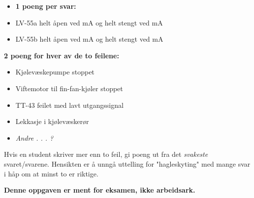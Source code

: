 \begin{itemize}
\item{} {\bf 1 poeng per svar:}
\item{} LV-55a helt åpen ved  mA og helt stengt ved  mA
\item{} LV-55b helt åpen ved  mA og helt stengt ved  mA
\end{itemize}

\vskip 10pt

{\bf 2 poeng for hver av de to feilene:}

\begin{itemize}
\item{} Kjølevæskepumpe stoppet
\item{} Viftemotor til fin-fan-kjøler stoppet
\item{} TT-43 feilet med lavt utgangssignal
\item{} Lekkasje i kjølevæskerør
\item{} {\it Andre . . . ?}
\end{itemize}

Hvis en student skriver mer enn to feil, gi poeng ut fra det {\it svakeste} svaret/svarene. Hensikten er å unngå uttelling for "hagleskyting" med mange svar i håp om at minst to er riktige.








{\bf Denne oppgaven er ment for eksamen, ikke arbeidsark.}

